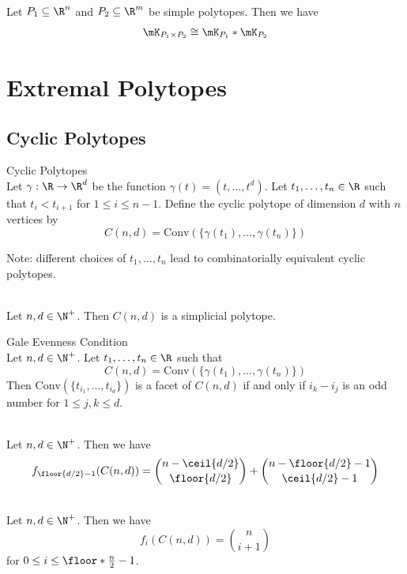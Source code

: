 \documentclass[a4paper]{article}
\begin{document}
\begin{lmm}{}{}\\
Let $P_1\subseteq\R^n$ and $P_2\subseteq\R^m$ be simple polytopes. Then we have $$\mK_{P_1\times P_2}\cong\mK_{P_1}\ast\mK_{P_2}$$
\end{lmm}

\pagebreak
\section{Extremal Polytopes}
\subsection{Cyclic Polytopes}
\begin{defn}{Cyclic Polytopes}{}\\
Let $\gamma:\R\to\R^d$ be the function $\gamma(t)=(t,\dots,t^d)$. Let $t_1,\dots,t_n\in\R$ such that $t_i<t_{i+1}$ for $1\leq i\leq n-1$. Define the cyclic polytope of dimension $d$ with $n$ vertices by $$C(n,d)=\text{Conv}(\{\gamma(t_1),\dots,\gamma(t_n)\})$$
\end{defn}

Note: different choices of $t_1,\dots,t_n$ lead to combinatorially equivalent cyclic polytopes. 

\begin{lmm}{}{}\\
Let $n,d\in\N^+$. Then $C(n,d)$ is a simplicial polytope. 
\end{lmm}

\begin{thm}{Gale Evenness Condition}{}\\
Let $n,d\in\N^+$. Let $t_1,\dots,t_n\in\R$ such that $$C(n,d)=\text{Conv}(\{\gamma(t_1),\dots,\gamma(t_n)\})$$ Then $\text{Conv}(\{t_{i_1},\dots,t_{i_d}\})$ is a facet of $C(n,d)$ if and only if $i_k-i_j$ is an odd number for $1\leq j,k\leq d$. 
\end{thm}

\begin{prp}{}{}\\
Let $n,d\in\N^+$. Then we have $$f_{\floor{d/2}-1}(C(n,d))=\binom{n-\ceil{d/2}}{\floor{d/2}}+\binom{n-\floor{d/2}-1}{\ceil{d/2}-1}$$
\end{prp}

\begin{lmm}{}{}\\
Let $n,d\in\N^+$. Then we have $$f_i(C(n,d))=\binom{n}{i+1}$$ for $0\leq i\leq\floor*{\frac{n}{2}}-1$. 
\end{lmm}
\end{document}
